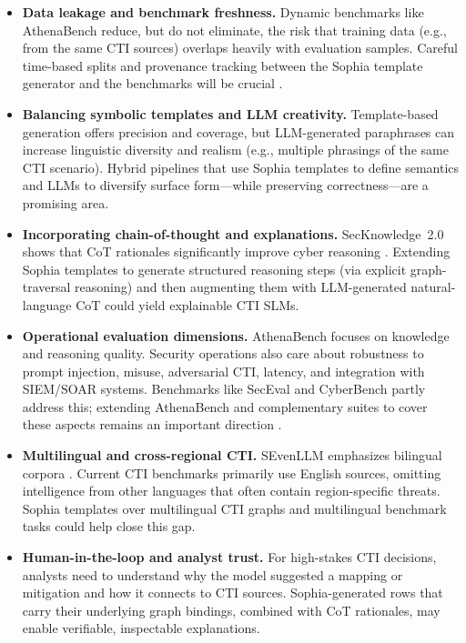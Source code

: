 \documentclass[unnumsec,webpdf,contemporary,large]{oup-authoring-template}
\theoremstyle{thmstyleone}
\theoremstyle{thmstyletwo}
\theoremstyle{thmstylethree}
\begin{document}
\begin{itemize}
  \item \textbf{Data leakage and benchmark freshness.} Dynamic benchmarks like AthenaBench reduce, but do not eliminate, the risk that training data (e.g., from the same CTI sources) overlaps heavily with evaluation samples. Careful time-based splits and provenance tracking between the Sophia template generator and the benchmarks will be crucial \cite{alam2025athenabench,cardei2025ift}.
  \item \textbf{Balancing symbolic templates and LLM creativity.} Template-based generation offers precision and coverage, but LLM-generated paraphrases can increase linguistic diversity and realism (e.g., multiple phrasings of the same CTI scenario). Hybrid pipelines that use Sophia templates to define semantics and LLMs to diversify surface form---while preserving correctness---are a promising area.
  \item \textbf{Incorporating chain-of-thought and explanations.} SecKnowledge~2.0 shows that CoT rationales significantly improve cyber reasoning \cite{levi2025toward}. Extending Sophia templates to generate structured reasoning steps (via explicit graph-traversal reasoning) and then augmenting them with LLM-generated natural-language CoT could yield explainable CTI SLMs.
  \item \textbf{Operational evaluation dimensions.} AthenaBench focuses on knowledge and reasoning quality. Security operations also care about robustness to prompt injection, misuse, adversarial CTI, latency, and integration with SIEM/SOAR systems. Benchmarks like SecEval and CyberBench partly address this; extending AthenaBench and complementary suites to cover these aspects remains an important direction \cite{hu2024seceval,liu2024cyberbench,alam2025athenabench}.
  \item \textbf{Multilingual and cross-regional CTI.} SEvenLLM emphasizes bilingual corpora \cite{ji2024sevenllm}. Current CTI benchmarks primarily use English sources, omitting intelligence from other languages that often contain region-specific threats. Sophia templates over multilingual CTI graphs and multilingual benchmark tasks could help close this gap.
  \item \textbf{Human-in-the-loop and analyst trust.} For high-stakes CTI decisions, analysts need to understand why the model suggested a mapping or mitigation and how it connects to CTI sources. Sophia-generated rows that carry their underlying graph bindings, combined with CoT rationales, may enable verifiable, inspectable explanations.
\end{itemize}
\end{document}

